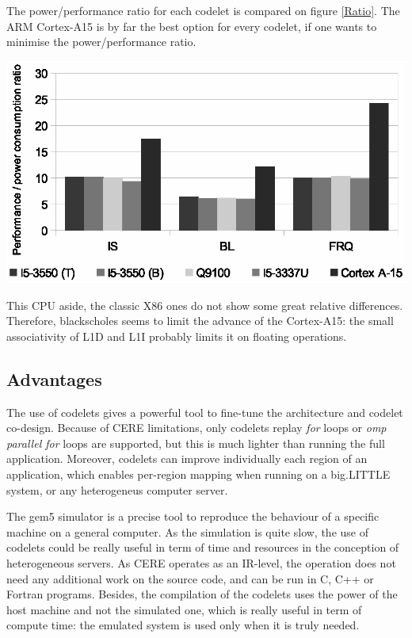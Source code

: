 \documentclass{article}
\newenvironment{Figure}
  {\par\medskip\noindent\center\minipage{0.9\linewidth}}
  {\endminipage\par\bigskip\medskip}
\begin{document}
\begin{multicols}{2}
The power/performance ratio for each codelet is compared on figure \ref{Ratio}. The ARM Cortex-A15 is by far the best option for every codelet, if one wants to minimise the power/performance ratio.

\begin{Figure}
\centering
\includegraphics[width=\linewidth]{Ratio.eps}
\end{Figure}

This CPU aside, the classic X86 ones do not show some great relative differences. Therefore, blackscholes seems to limit the advance of the Cortex-A15: the small associativity of L1D and L1I probably limits it on floating operations.


\subsection{Advantages}
The use of codelets gives a powerful tool to fine-tune the architecture and codelet co-design. Because of CERE limitations, only codelets replay \textit{for} loops or \textit{omp parallel for} loops are supported, but this is much lighter than running the full application. Moreover, codelets can improve individually each region of an application, which enables per-region mapping when running on a big.LITTLE system, or any heterogeneus computer server.

The gem5 simulator is a precise tool to reproduce the behaviour of a specific machine on a general computer. As the simulation is quite slow, the use of codelets could be really useful in term of time and resources in the conception of heterogeneous servers. As CERE operates as an IR-level, the operation does not need any additional work on the source code, and can be run in C, C++ or Fortran programs. Besides, the compilation of the codelets uses the power of the host machine and not the simulated one, which is really useful in term of compute time: the emulated system is used only when it is truly needed.


\end{multicols}
\end{document}

